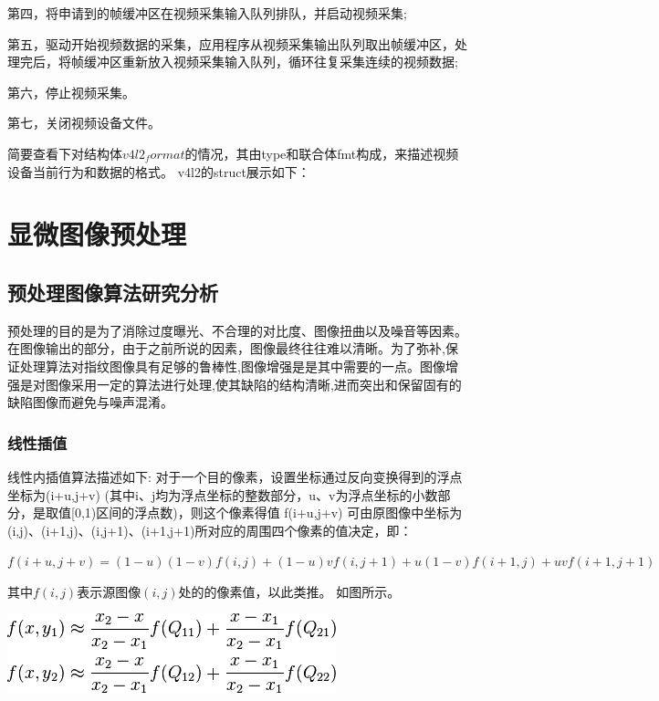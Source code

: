 第四，将申请到的帧缓冲区在视频采集输入队列排队，并启动视频采集;

第五，驱动开始视频数据的采集，应用程序从视频采集输出队列取出帧缓冲区，处理完后，将帧缓冲区重新放入视频采集输入队列，循环往复采集连续的视频数据;

第六，停止视频采集。

第七，关闭视频设备文件。

简要查看下对结构体$v4l2_format$的情况，其由type和联合体fmt构成，来描述视频设备当前行为和数据的格式。
v4l2的struct展示如下：





\section{显微图像预处理}
\subsection{预处理图像算法研究分析}
预处理的目的是为了消除过度曝光、不合理的对比度、图像扭曲以及噪音等因素。在图像输出的部分，由于之前所说的因素，图像最终往往难以清晰。为了弥补,保证处理算法对指纹图像具有足够的鲁棒性,图像增强是是其中需要的一点。图像增强是对图像采用一定的算法进行处理,使其缺陷的结构清晰,进而突出和保留固有的缺陷图像而避免与噪声混淆。\cite{imageprocessing}
\subsubsection{线性插值}
线性内插值算法描述如下:
对于一个目的像素，设置坐标通过反向变换得到的浮点坐标为(i+u,j+v) (其中i、j均为浮点坐标的整数部分，u、v为浮点坐标的小数部分，是取值[0,1)区间的浮点数)，则这个像素得值 f(i+u,j+v) 可由原图像中坐标为 (i,j)、(i+1,j)、(i,j+1)、(i+1,j+1)所对应的周围四个像素的值决定，即：

$f(i+u,j+v) = (1-u)(1-v)f(i,j) + (1-u)vf(i,j+1) + u(1-v)f(i+1,j) + uvf(i+1,j+1)$                          

其中$f(i,j)$表示源图像$(i,j)$处的的像素值，以此类推。
如图所示。


\begin{center}
\includegraphics[width=0.7\linewidth]{Figure/figureline_1}
\end{center}


